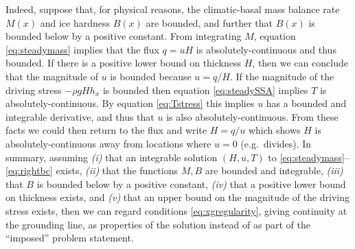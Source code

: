 \documentclass[twocolumn]{igs}
\begin{document}
Indeed, suppose that, for physical reasons, the climatic-basal mass balance rate $M(x)$ and ice hardness $B(x)$ are bounded, and further that $B(x)$ is bounded below by a positive constant.  From integrating $M$, equation \eqref{eq:steadymass} implies that the flux $q=uH$ is absolutely-continuous and thus bounded.  If there is a positive lower bound on thickness $H$, then we can conclude that the magnitude of $u$ is bounded because $u=q/H$.  If the magnitude of the driving stress $-\rho g H h_x$ is bounded then equation \eqref{eq:steadySSA} implies $T$ is absolutely-continuous.  By equation \eqref{eq:Tstress} this implies $u$ has a bounded and integrable derivative, and thus that $u$ is also absolutely-continuous.  From these facts we could then return to the flux and write $H=q/u$ which shows $H$ is absolutely-continuous away from locations where $u=0$ (e.g.~divides).  In summary, assuming \emph{(i)} that an integrable solution $(H,u,T)$ to \eqref{eq:steadymass}--\eqref{eq:rightbc} exists, \emph{(ii)} that the functions $M,B$ are bounded and integrable, \emph{(iii)} that $B$ is bounded below by a positive constant, \emph{(iv)} that a positive lower bound on thickness exists, and \emph{(v)} that an upper bound on the magnitude of the driving stress exists, then we can regard conditions \eqref{eq:xgregularity}, giving continuity at the grounding line, as properties of the solution instead of as part of the ``imposed'' problem statement.
\end{document}
